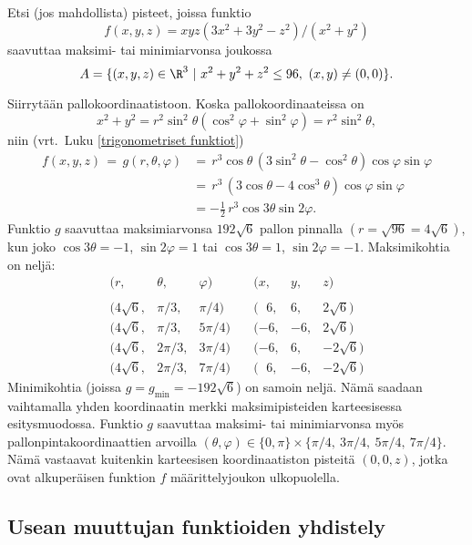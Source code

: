\begin{Exa}
Etsi (jos mahdollista) pisteet, joissa funktio
\[
f(x,y,z)=xyz(3x^2+3y^2-z^2)/(x^2+y^2)
\]
saavuttaa maksimi- tai minimiarvonsa joukossa
\[
A=\{(x,y,z)\in\R^3 \ | \ x^2+y^2+z^2\leq 96, \ (x,y)\neq (0,0)\}.
\]
\end{Exa}
\ratk Siirrytään pallokoordinaatistoon. Koska pallokoordinaateissa on
\[
x^2+y^2=r^2\sin^2\theta(\cos^2\varphi + \sin^2\varphi)=r^2\sin^2\theta,
\]
niin (vrt.\ Luku \ref{trigonometriset funktiot})
\begin{align*}
f(x,y,z)\,=\,g(r,\theta,\varphi) 
         &=\,r^3\cos\theta\,(3\sin^2\theta-\cos^2\theta)\cos\varphi\sin\varphi \\[2mm]
         &=\,r^3\,(3\cos\theta-4\cos^3\theta)\cos\varphi\sin\varphi \\
         &=-\frac{1}{2}\,r^3\cos 3\theta\sin 2\varphi.
\end{align*}
Funktio $g$ saavuttaa maksimiarvonsa $192\sqrt{6}$ pallon pinnalla $(r=\sqrt{96}=4\sqrt{6})$, 
kun joko $\cos 3\theta=-1$, $\sin 2\varphi=1$ tai $\cos 3\theta=1$, $\sin 2\varphi=-1$. 
Maksimikohtia on neljä:
\[
\begin{array}{llllrr}
(r, & \theta, & \varphi) & (x, & y, & z) \\ \\
(4\sqrt{6}, & \pi/3, & \pi/4) \quad & (\ \: \, 6, &6, &2\sqrt{6}) \\ 
(4\sqrt{6}, & \pi/3, & 5\pi/4) \quad & (-6, &-6, &2\sqrt{6}) \\ 
(4\sqrt{6}, & 2\pi/3, & 3\pi/4) \quad & (-6, & 6, &-2\sqrt{6}) \\ 
(4\sqrt{6}, & 2\pi/3, & 7\pi/4) \quad & (\ \: \, 6, &-6, &-2\sqrt{6})
\end{array}
\]
Minimikohtia (joissa $g=g_{\text{min}}=-192\sqrt{6}$) on samoin neljä. Nämä saadaan vaihtamalla
yhden koordinaatin merkki maksimipisteiden karteesisessa esitysmuodossa. Funktio $g$ saavuttaa
maksimi- tai minimiarvonsa myös pallonpintakoordinaattien arvoilla 
$(\theta,\varphi) \in  \{0,\pi\} \times \{\pi/4,\ 3\pi/4,\ 5\pi/4,\ 7\pi/4\}$. Nämä vastaavat 
kuitenkin karteesisen koordinaatiston pisteitä $(0,0,z)$, jotka ovat alkuperäisen funktion $f$ 
määrittelyjoukon ulkopuolella. \loppu

\subsection*{Usean muuttujan funktioiden yhdistely}

